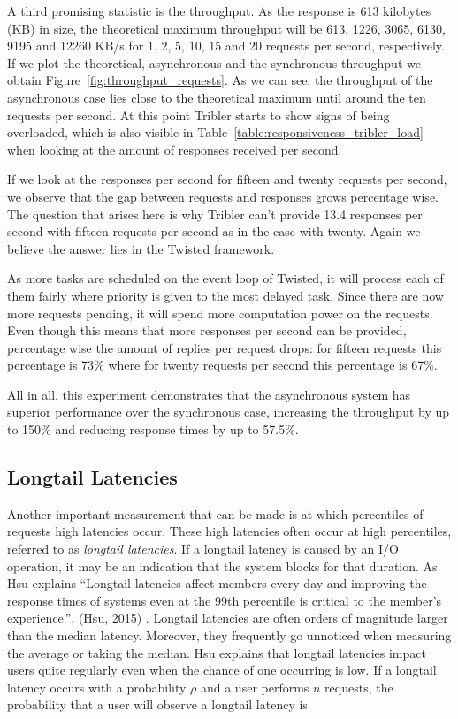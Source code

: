 A third promising statistic is the throughput.
As the response is 613 kilobytes (KB) in size, the theoretical maximum throughput will be 613, 1226, 3065, 6130, 9195 and 12260 KB/s for 1, 2, 5, 10, 15 and 20 requests per second, respectively.
If we plot the theoretical, asynchronous and the synchronous throughput we obtain Figure~\ref{fig:throughput_requests}.
As we can see, the throughput of the asynchronous case lies close to the theoretical maximum until around the ten requests per second.
At this point Tribler starts to show signs of being overloaded, which is also visible in Table~\ref{table:responsiveness_tribler_load} when looking at the amount of responses received per second.

If we look at the responses per second for fifteen and twenty requests per second, we observe that the gap between requests and responses grows percentage wise.
The question that arises here is why Tribler can't provide 13.4 responses per second with fifteen requests per second as in the case with twenty.
Again we believe the answer lies in the Twisted framework.

As more tasks are scheduled on the event loop of Twisted, it will process each of them fairly where priority is given to the most delayed task.
Since there are now more requests pending, it will spend more computation power on the requests.
Even though this means that more responses per second can be provided, percentage wise the amount of replies per request drops: for fifteen requests this percentage is 73\% where for twenty requests per second this percentage is 67\%.

All in all, this experiment demonstrates that the asynchronous system has superior performance over the synchronous case, increasing the throughput by up to 150\% and reducing response times by up to 57.5\%.

\subsection{Longtail Latencies}
\label{longtail_latencies}

Another important measurement that can be made is at which percentiles of requests high latencies occur.
These high latencies often occur at high percentiles, referred to as \emph{longtail latencies}.
If a longtail latency is caused by an I/O operation, it may be an indication that the system blocks for that duration.
As Hsu explains \enquote{Longtail latencies affect members every day and improving the response times of systems even at the 99th percentile is critical to the member's experience.}, (Hsu, 2015) \cite{hsu2015who}.
Longtail latencies are often orders of magnitude larger than the median latency.
Moreover, they frequently go unnoticed when measuring the average or taking the median.
Hsu explains that longtail latencies impact users quite regularly even when the chance of one occurring is low.
If a longtail latency occurs with a probability $\rho$ and a user performs $n$ requests, the probability that a user will observe a longtail latency is 

